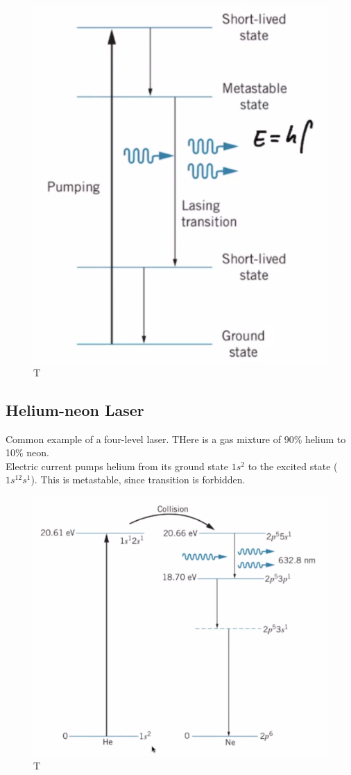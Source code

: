 \documentclass[class=article,crop=false]{standalone}
\begin{document}
\begin{figure}[h!]
	\centering
	\includegraphics[width=.6\linewidth]{./Images/four-level.png}
	\caption{T}
\end{figure}

\subsection{Helium-neon Laser}
Common example of a four-level laser. THere is a gas mixture of 90\% helium to 10\% neon. \\

Electric current pumps helium from its ground state $1s^2$ to the excited state ($1s^12s^1$). This is metastable, since transition is forbidden.\\

\begin{figure}[h!]
	\centering
	\includegraphics[width=.6\linewidth]{./Images/helium-neon.png}
	\caption{T}
\end{figure}
\end{document}
